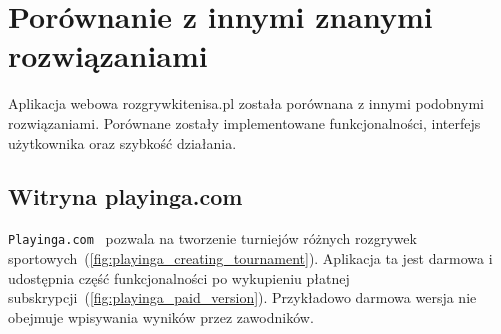 \documentclass[shortabstract]{iithesis}
\begin{document}
\section{Porównanie z innymi znanymi rozwiązaniami}
Aplikacja webowa rozgrywkitenisa.pl została porównana z innymi podobnymi rozwiązaniami.
Porównane zostały implementowane funkcjonalności, interfejs użytkownika oraz szybkość działania.

\subsection{Witryna playinga.com}
\texttt{Playinga.com}~\cite{Playinga} pozwala na tworzenie turniejów różnych rozgrywek sportowych~(\ref{fig:playinga_creating_tournament}).
Aplikacja ta jest darmowa i udostępnia część funkcjonalności po wykupieniu płatnej subskrypcji~(\ref{fig:playinga_paid_version}).
Przykładowo darmowa wersja nie obejmuje wpisywania wyników przez zawodników.
\end{document}
